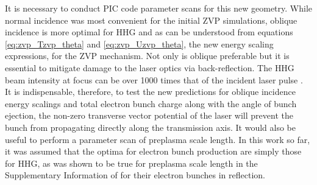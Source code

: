 It is necessary to conduct PIC code parameter scans for this new geometry. While normal incidence was most convenient for the initial ZVP simulations, oblique incidence is more optimal for \ac{HHG} \cite{gonoskovUltrarelativisticNanoplasmonicsRoute2011, edwardsXRayEmissionEffectiveness2020} and as can be understood from equations \ref{eq:zvp_Tzvp_theta} and \ref{eq:zvp_Uzvp_theta}, the new energy scaling expressions, for the ZVP mechanism. Not only is oblique preferable but it is essential to mitigate damage to the laser optics via back-reflection. The \ac{HHG} beam intensity at focus can be over 1000 times that of the incident laser pulse \cite{quereReflectingPetawattLasers2021}. It is indispensable, therefore, to test the new predictions for oblique incidence energy scalings and total electron bunch charge along with the angle of bunch ejection, the non-zero transverse vector potential of the laser will prevent the bunch from propagating directly along the transmission axis. It would also be useful to perform a parameter scan of preplasma scale length. In this work so far, it was assumed that the optima for electron bunch production are simply those for \ac{HHG}, as was shown to be true for preplasma scale length in the Supplementary Information of \cite{thevenetVacuumLaserAcceleration2016} for their electron bunches in reflection.

